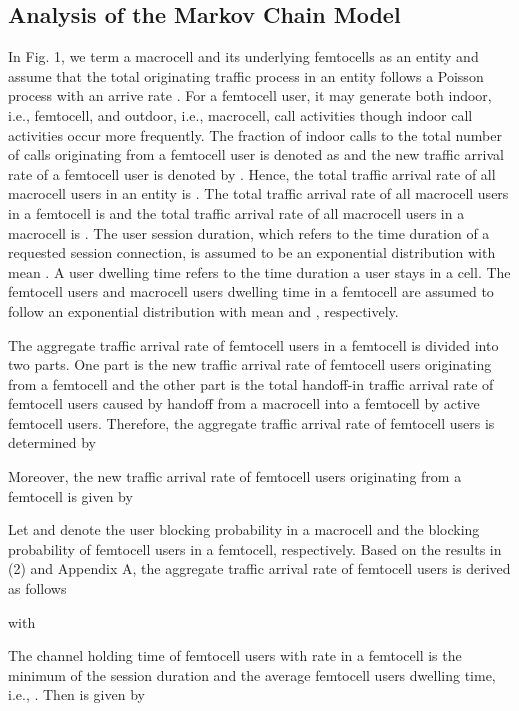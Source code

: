 \documentclass[10pt,final,journal,letterpaper,twoside,twocolumn]{IEEEtran}
\begin{document}
\subsection{Analysis of the Markov Chain Model}

In Fig. 1, we term a macrocell and its underlying  femtocells as an entity
and assume that the total originating traffic process in an entity follows a
Poisson process with an arrive rate . For a femtocell user, it
may generate both indoor, i.e., femtocell, and outdoor, i.e., macrocell, call activities though indoor call activities occur more frequently. The fraction of indoor calls to the total number of calls originating from a femtocell user is denoted as  and the new traffic arrival rate of a femtocell
user is denoted by . Hence, the total traffic arrival rate of all macrocell users in an entity is
. The total traffic arrival rate of all macrocell users in a femtocell is 
and the total traffic arrival rate of all macrocell users in a macrocell is . The user session duration, which refers to the time duration of a requested session connection, is
assumed to be an exponential distribution with mean . A user dwelling time refers to the time
duration a user stays in a cell. The femtocell users and macrocell users dwelling time in a femtocell are assumed to follow an exponential distribution with mean
 and , respectively.


The aggregate traffic arrival rate of femtocell users  in a femtocell  is
divided into two parts. One part is the new traffic arrival rate of femtocell users  originating from a femtocell and the other part is the total handoff-in traffic arrival rate of femtocell users  caused by handoff from a macrocell into a femtocell by active
femtocell users. Therefore, the aggregate traffic arrival rate of femtocell users  is determined by



Moreover, the new traffic arrival rate of femtocell users  originating from a femtocell is given by


Let  and  denote the user blocking probability in a
macrocell and the blocking probability of femtocell users in a femtocell,
respectively. Based on the results in (2) and Appendix A, the aggregate traffic arrival rate of femtocell users  is derived as follows

with





The channel holding time of femtocell users  with rate  in a femtocell is the minimum of the session duration and the average femtocell users dwelling time, i.e., . Then  is given by \cite{Shun05}
\end{document}
